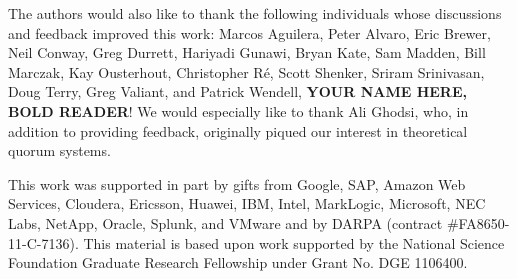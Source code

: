 \documentclass{vldb}
\begin{document}
The authors would also like to thank the following individuals whose
discussions and feedback improved this work: Marcos Aguilera, Peter
Alvaro, Eric Brewer, Neil Conway, Greg Durrett, Hariyadi Gunawi, Bryan
Kate, Sam Madden, Bill Marczak, Kay Ousterhout, Christopher R\'e,
Scott Shenker, Sriram Srinivasan, Doug Terry, Greg Valiant, and
Patrick Wendell, \textbf{YOUR NAME HERE, BOLD READER}!  We would
especially like to thank Ali Ghodsi, who, in addition to providing
feedback, originally piqued our interest in theoretical quorum
systems.

This work was supported in part by gifts from Google, SAP,
Amazon Web Services, Cloudera, Ericsson, Huawei, IBM, Intel,
MarkLogic, Microsoft, NEC Labs, NetApp, Oracle, Splunk, and VMware and
by DARPA (contract \#FA8650-11-C-7136).  This material is based upon
work supported by the National Science Foundation Graduate Research
Fellowship under Grant No. DGE 1106400.

\balance

{\small


}
\end{document}
